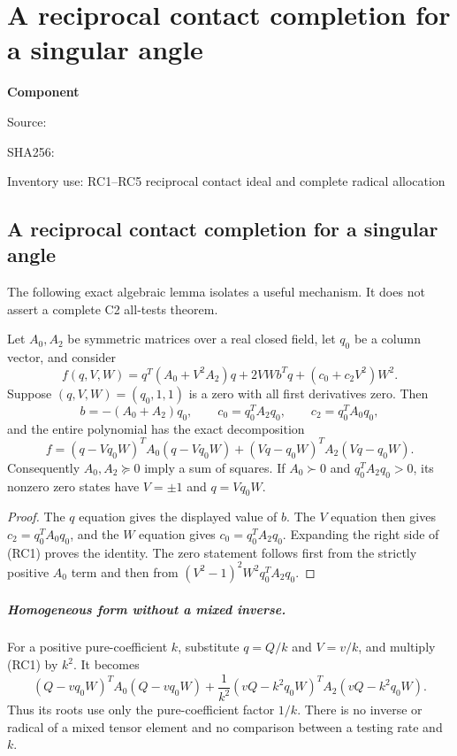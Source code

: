 \chapter{A reciprocal contact completion for a singular angle}
\label{component:pa142a027a282}
\noindent\textbf{Component }\par
{\small\noindent Source: \par}
{\small\noindent SHA256: \par}
{\small\noindent Inventory use: RC1--RC5 reciprocal contact ideal and complete radical allocation\par}
\medskip
\section[A reciprocal contact completion for a singular angle]{A reciprocal contact completion for a singular angle}
\label{pa142a027a282:sec:ui-reciprocal-contact}

The following exact algebraic lemma isolates a useful mechanism. It
does not assert a complete C2 all-tests theorem.

\begin{lemma}
Let $A_0,A_2$ be symmetric matrices over a real closed field, let
$q_0$ be a column vector, and consider
\[
 f(q,V,W)=q^T(A_0+V^2A_2)q+2VW b^Tq+(c_0+c_2V^2)W^2.
\]
Suppose $(q,V,W)=(q_0,1,1)$ is a zero with all first derivatives
zero. Then
\[
 b=-(A_0+A_2)q_0,\qquad
 c_0=q_0^TA_2q_0,\qquad c_2=q_0^TA_0q_0,
\]
and the entire polynomial has the exact decomposition
\[
 \boxed{f=(q-Vq_0W)^TA_0(q-Vq_0W)
             +(Vq-q_0W)^TA_2(Vq-q_0W).}             \tag{RC1}
\]
Consequently $A_0,A_2\succeq0$ imply a sum of squares. If
$A_0\succ0$ and $q_0^TA_2q_0>0$, its nonzero zero states have
$V=\pm1$ and $q=Vq_0W$.
\end{lemma}
\begin{proof}
The $q$ equation gives the displayed value of $b$. The $V$
equation then gives $c_2=q_0^TA_0q_0$, and the $W$ equation gives
$c_0=q_0^TA_2q_0$. Expanding the right side of (RC1) proves the
identity. The zero statement follows first from the strictly positive
$A_0$ term and then from $(V^2-1)^2W^2q_0^TA_2q_0$.
\end{proof}

\paragraph{Homogeneous form without a mixed inverse.}
For a positive pure-coefficient $k$, substitute $q=Q/k$ and
$V=v/k$, and multiply (RC1) by $k^2$. It becomes
\[
 (Q-vq_0W)^TA_0(Q-vq_0W)
 +\frac1{k^2}(vQ-k^2q_0W)^TA_2(vQ-k^2q_0W).       \tag{RC2}
\]
Thus its roots use only the pure-coefficient factor $1/k$.
There is no inverse or radical of a mixed tensor element and no
comparison between a testing rate and $k$.

